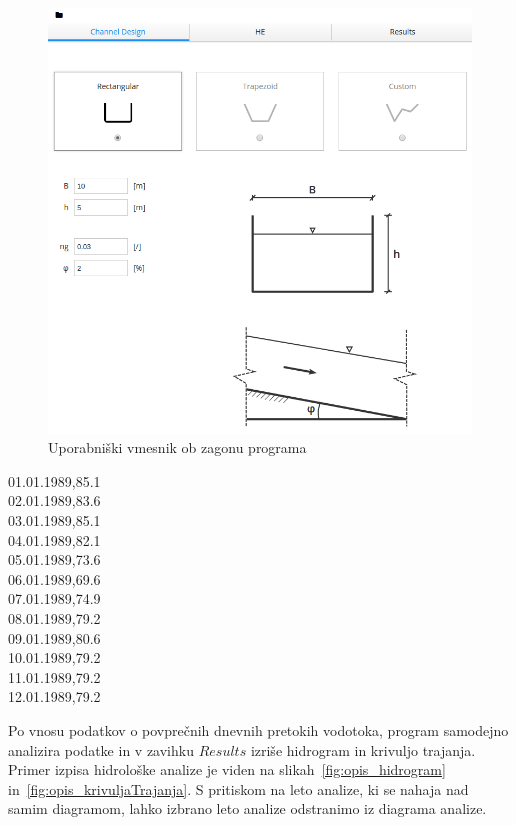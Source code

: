 \begin{figure}[htp!]
	\begin{centering}
		\includegraphics[width=\textwidth]{slike/opis/frontpage.png}\caption{Uporabniški vmesnik ob zagonu programa}\label{fig:opis_frontpage}
	\end{centering}
\end{figure}

\begin{center}
01.01.1989,85.1\\
02.01.1989,83.6\\
03.01.1989,85.1\\
04.01.1989,82.1\\
05.01.1989,73.6\\
06.01.1989,69.6\\
07.01.1989,74.9\\
08.01.1989,79.2\\
09.01.1989,80.6\\
10.01.1989,79.2\\
11.01.1989,79.2\\
12.01.1989,79.2\\
\end{center}

Po vnosu podatkov o povprečnih dnevnih pretokih vodotoka, program samodejno analizira podatke in v zavihku $Results$ izriše hidrogram in krivuljo trajanja. Primer izpisa hidrološke analize je viden na slikah~\ref{fig:opis_hidrogram} in~\ref{fig:opis_krivuljaTrajanja}. S pritiskom na leto analize, ki se nahaja nad samim diagramom, lahko izbrano leto analize odstranimo iz diagrama analize.


